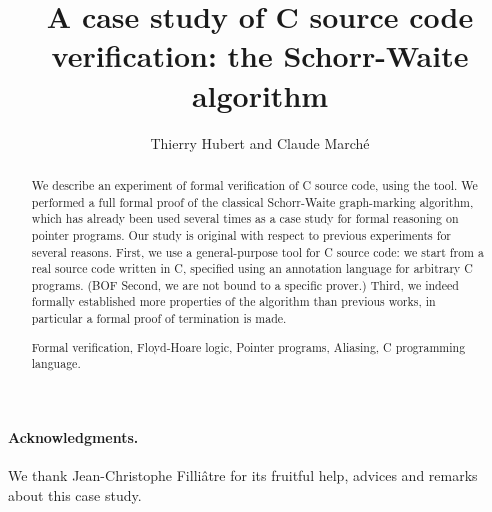 \documentclass{llncs}
\begin{document}
\title{A case study of C source code verification: the Schorr-Waite algorithm}
\author{Thierry Hubert and Claude March\'e}
\maketitle

\begin{abstract}
  We describe an experiment of formal verification of C source code,
  using the \caduceus{} tool. We performed a full formal proof of the
  classical Schorr-Waite graph-marking algorithm, which has already
  been used several times as a case study for formal reasoning
  on pointer programs. Our study is original with respect to previous
  experiments for several reasons. First, we use a general-purpose
  tool for C source code: we start from a real source code written in
  C, specified using an annotation language for arbitrary C programs.
  (BOF Second, we are not bound to a specific prover.) Third, we
  indeed formally established more properties of the algorithm than
  previous works, in particular a formal proof of termination is made.

   Formal verification, Floyd-Hoare logic,
  Pointer programs, Aliasing, C programming language.
\end{abstract}








\bigskip
\paragraph{Acknowledgments.} 
We thank Jean-Christophe Filli\^atre for its fruitful help, advices and
remarks about this case study.



\end{document}
